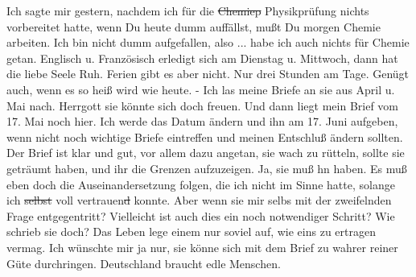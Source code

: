 \def\day{11. Juni 1944.}
\mktitle

Ich sagte mir gestern, nachdem ich f\"{u}r die \st{Chemiep} Physikpr\"{u}fung nichts vorbereitet hatte, wenn Du heute dumm auff\"{a}llst, mu{\ss}t Du morgen Chemie arbeiten.
Ich bin nicht dumm aufgefallen, also ... habe ich auch nichts f\"{u}r Chemie getan.
Englisch u. Franz\"{o}sisch erledigt sich am Dienstag u. Mittwoch, dann hat die liebe Seele Ruh.
Ferien gibt es aber nicht.
Nur drei Stunden am Tage.
Gen\"{u}gt auch, wenn es so hei{\ss} wird wie heute.
- Ich las meine Briefe an sie aus April u. Mai nach.
Herrgott sie k\"{o}nnte sich doch freuen.
Und dann liegt mein Brief vom 17. Mai noch hier.
Ich werde das Datum \"{a}ndern und ihn am 17. Juni aufgeben, wenn nicht noch wichtige Briefe eintreffen und meinen Entschlu{\ss} \"{a}ndern sollten.
Der Brief ist klar und gut, vor allem dazu angetan, sie wach zu r\"{u}tteln, sollte sie getr\"{a}umt haben, und ihr die Grenzen aufzuzeigen.
Ja, sie mu{\ss} hn haben.
Es mu{\ss} eben doch die Auseinandersetzung folgen, die ich nicht im Sinne hatte, solange ich \st{selbst} voll vertrauen\st{d} konnte.
Aber wenn sie mir selbs mit der zweifelnden Frage entgegentritt?
Vielleicht ist auch dies ein noch notwendiger Schritt?
Wie schrieb sie doch?
Das Leben lege einem nur soviel auf, wie eins zu ertragen vermag.
Ich w\"{u}nschte mir ja nur, sie k\"{o}nne sich mit dem Brief zu wahrer reiner G\"{u}te durchringen.
Deutschland braucht edle Menschen.

\clearpage
